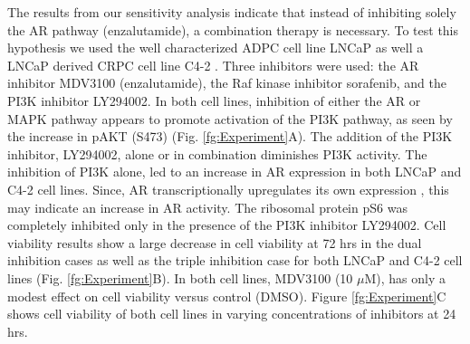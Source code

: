 \documentclass[12pt]{article}
\begin{document}
The results from our sensitivity analysis indicate that instead of inhibiting solely the AR pathway (enzalutamide), a combination therapy is necessary. 
To test this hypothesis we used the well characterized ADPC cell line LNCaP as well a LNCaP derived CRPC cell line C4-2 \cite{Thalmann1994}. 
Three inhibitors were used: the AR inhibitor MDV3100 (enzalutamide), the Raf kinase inhibitor sorafenib, and the PI3K inhibitor LY294002. 
In both cell lines, inhibition of either the AR or MAPK pathway appears to promote activation of the PI3K pathway, as seen by the increase in pAKT (S473) (Fig. \ref{fg:Experiment}A). 
The addition of the PI3K inhibitor, LY294002, alone or in combination diminishes PI3K activity. 
The inhibition of PI3K alone, led to an increase in AR expression in both LNCaP and C4-2 cell lines. 
Since, AR transcriptionally upregulates its own expression \cite{Lin2003}\cite{Grad1999}, this may indicate an increase in AR activity. 
The ribosomal protein pS6 was completely inhibited only in the presence of the PI3K inhibitor LY294002. 
Cell viability results show a large decrease in cell viability at 72 hrs in the dual inhibition cases as well as the triple inhibition case for both LNCaP and C4-2 cell lines (Fig. \ref{fg:Experiment}B). 
In both cell lines, MDV3100 (10 $\mu$M), has only a modest effect on cell viability versus control (DMSO). 
Figure \ref{fg:Experiment}C shows cell viability of both cell lines in varying concentrations of inhibitors at 24 hrs. 
\end{document}
